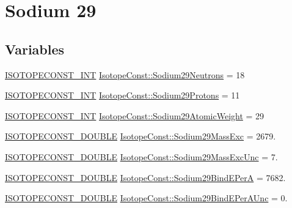 \hypertarget{group___isotope_const-_sodium-_na29}{}\section{Sodium 29}
\label{group___isotope_const-_sodium-_na29}
\subsection*{Variables}
\begin{DoxyCompactItemize}
\item 
\mbox{\hyperlink{group___isotope_const-_macros_ga5f18360b3e99483a35c32d789e62621c}{I\+S\+O\+T\+O\+P\+E\+C\+O\+N\+S\+T\+\_\+\+I\+NT}} \mbox{\hyperlink{group___isotope_const-_sodium-_na29_ga9e1d6d311393a40aea5bc420a155dfcb}{Isotope\+Const\+::\+Sodium29\+Neutrons}} = 18
\item 
\mbox{\hyperlink{group___isotope_const-_macros_ga5f18360b3e99483a35c32d789e62621c}{I\+S\+O\+T\+O\+P\+E\+C\+O\+N\+S\+T\+\_\+\+I\+NT}} \mbox{\hyperlink{group___isotope_const-_sodium-_na29_gadf2d820de48ddd3c0f15404ff753c73a}{Isotope\+Const\+::\+Sodium29\+Protons}} = 11
\item 
\mbox{\hyperlink{group___isotope_const-_macros_ga5f18360b3e99483a35c32d789e62621c}{I\+S\+O\+T\+O\+P\+E\+C\+O\+N\+S\+T\+\_\+\+I\+NT}} \mbox{\hyperlink{group___isotope_const-_sodium-_na29_ga7d2aa85c103c25b506f59e554098f8c0}{Isotope\+Const\+::\+Sodium29\+Atomic\+Weight}} = 29
\item 
\mbox{\hyperlink{group___isotope_const-_macros_ga8f45a7272ce02c0b4c65c44636ed719a}{I\+S\+O\+T\+O\+P\+E\+C\+O\+N\+S\+T\+\_\+\+D\+O\+U\+B\+LE}} \mbox{\hyperlink{group___isotope_const-_sodium-_na29_gac44e06b2d1e717924e5ee5246999ec23}{Isotope\+Const\+::\+Sodium29\+Mass\+Exc}} = 2679.
\item 
\mbox{\hyperlink{group___isotope_const-_macros_ga8f45a7272ce02c0b4c65c44636ed719a}{I\+S\+O\+T\+O\+P\+E\+C\+O\+N\+S\+T\+\_\+\+D\+O\+U\+B\+LE}} \mbox{\hyperlink{group___isotope_const-_sodium-_na29_ga3241330c8dc7d8f2f3bc5bd97dc97d6b}{Isotope\+Const\+::\+Sodium29\+Mass\+Exc\+Unc}} = 7.
\item 
\mbox{\hyperlink{group___isotope_const-_macros_ga8f45a7272ce02c0b4c65c44636ed719a}{I\+S\+O\+T\+O\+P\+E\+C\+O\+N\+S\+T\+\_\+\+D\+O\+U\+B\+LE}} \mbox{\hyperlink{group___isotope_const-_sodium-_na29_ga6f9b857cc01bd71fef7cf995a5298e3f}{Isotope\+Const\+::\+Sodium29\+Bind\+E\+PerA}} = 7682.
\item 
\mbox{\hyperlink{group___isotope_const-_macros_ga8f45a7272ce02c0b4c65c44636ed719a}{I\+S\+O\+T\+O\+P\+E\+C\+O\+N\+S\+T\+\_\+\+D\+O\+U\+B\+LE}} \mbox{\hyperlink{group___isotope_const-_sodium-_na29_ga21b2d8a307428f24b3e8aaed19d578b6}{Isotope\+Const\+::\+Sodium29\+Bind\+E\+Per\+A\+Unc}} = 0.

\end{DoxyCompactItemize}

